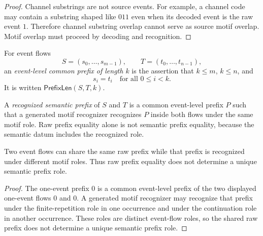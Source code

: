 \begin{proof}
Channel substrings are not source events. For example, a channel code may contain a substring shaped like $011$ even when its decoded event is the raw event $1$. Therefore channel substring overlap cannot serve as source motif overlap. Motif overlap must proceed by decoding and recognition.
\end{proof}

\begin{definition}
\label{def:motif-generated-event-common-prefix}
For event flows
$$
  S=(s_0,\ldots,s_{m-1}),
  \qquad
  T=(t_0,\ldots,t_{n-1}),
$$
an \emph{event-level common prefix of length $k$} is the assertion that $k\leq m$, $k\leq n$, and
$$
  s_i=t_i
  \quad\text{for all }0\leq i<k.
$$
It is written $\mathsf{PrefixLen}(S,T,k)$.
\end{definition}

\begin{definition}
\label{def:motif-generated-semantic-prefix}
A \emph{recognized semantic prefix} of $S$ and $T$ is a common event-level prefix $P$ such that a generated motif recognizer recognizes $P$ inside both flows under the same motif role. Raw prefix equality alone is not semantic prefix equality, because the semantic datum includes the recognized role.
\end{definition}

\begin{proposition}
\label{prop:motif-generated-raw-prefix-not-semantic-prefix}
Two event flows can share the same raw prefix while that prefix is recognized under different motif roles. Thus raw prefix equality does not determine a unique semantic prefix role.
\end{proposition}

\begin{proof}
The one-event prefix $0$ is a common event-level prefix of the two displayed one-event flows $0$ and $0$. A generated motif recognizer may recognize that prefix under the finite-repetition role in one occurrence and under the continuation role in another occurrence. These roles are distinct event-flow roles, so the shared raw prefix does not determine a unique semantic prefix role.
\end{proof}

